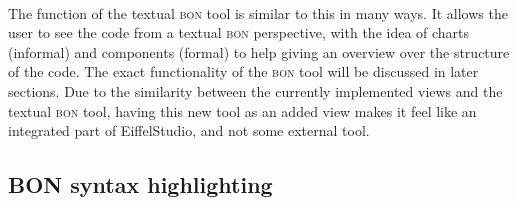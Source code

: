 \paragraph{}
The function of the textual \textsc{bon} tool is similar to this in many ways. It allows the user to see the code from a textual \textsc{bon} perspective, with the idea of charts (informal) and components (formal) to help giving an overview over the structure of the code. The exact functionality of the \textsc{bon} tool will be discussed in later sections. Due to the similarity between the currently implemented views and the textual \textsc{bon} tool, having this new tool as an added view makes it feel like an integrated part of EiffelStudio, and not some external tool.

\subsection{BON syntax highlighting}